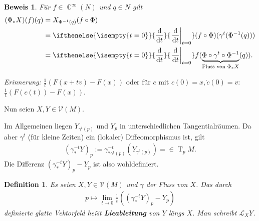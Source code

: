 \documentclass[paper=A4, twoside, chapterprefix=true, bibliography=totoc, headsepline]{scrbook}
\DeclareMathOperator{\C}{\mathbb{C}}
\DeclareMathOperator{\T}{T}         %
\newcommand{\dop}{\mathrm{d}}
\newcommand{\difffrac}[3][]{\ifthenelse{\isempty{#1}}{\frac{\dop #2}{\dop #3}}{\left. \frac{\dop #2}{\dop #3} \right|_{#1}}}
\theoremstyle{plain}
\newtheorem{Dfn}{Definition}[chapter]
\newtheorem{Bem}[Dfn]{Bemerkung}
\theoremstyle{nonumberplain}
\newtheorem{bew}{Beweis}
\theoremstyle{empty}
\theoremstyle{break}
\newcommand{\CmIndex}[2][]{\ifthenelse{\isempty{#1}}{\index{#2}}{\index{#1}}#2}
\newcommand{\CmMark}[2][]{\textbf{\CmIndex[#1]{#2}}}
\begin{document}
\begin{bew}
F\"ur $f \in \C^{\infty}(N)$ und $q \in N$ gilt
\begin{align*}
	(\Phi_{\ast}X)(f)(q) & = X_{\Phi^{-1}(q)}(f \circ \Phi)\\
	& = \difffrac[t=0]{}{t} (f \circ \Phi)(\gamma^t(\Phi^{-1}(q)))\\
	& = \difffrac[t=0]{}{t}f(\underbrace{\Phi \circ \gamma^t \circ \Phi^{-1}}_{\text{Fluss von }\Phi_{*}X}(q)).
\end{align*}
\end{bew}

\emph{Erinnerung:} $\frac{1}t(F(x+tv)-F(x))$ oder f\"ur $c$ mit $c(0) = x, \dot c(0) = v$: $\frac{1}t(F(c(t))-F(x))$.

Nun seien $X,Y \in \mathcal V(M)$.
\begin{center}\end{center}

Im Allgemeinen liegen $Y_{\gamma^t(p)}$ und $Y_p$ in unterschiedlichen Tangentialr\"aumen.
Da aber $\gamma^t$ (f\"ur kleine Zeiten) ein (lokaler) Diffeomorphismus ist, gilt
\begin{align*}
  (\gamma_{*}^{-t}Y)_p := \gamma_{*\gamma^t(p)}^{-t}(Y_{\gamma^t(p)}) = \in \T_pM.
\end{align*}
Die Differenz $(\gamma_{*}^{-t}Y)_p - Y_p$ ist also wohldefiniert. 

\begin{Dfn}
  Es seien $X,Y \in \mathcal V(M)$ und $\gamma$ der Fluss von $X$.
Das durch 
\begin{align*}
  p \mapsto \lim_{t\to 0}\frac{1}t\left(\left(\gamma_{*}^{-t}Y\right)_p-Y_p\right)
\end{align*}
definierte glatte Vektorfeld hei\"st \CmMark{Lieableitung} von $Y$ l\"angs $X$. Man schreibt $\mathcal L_XY$.
\end{Dfn}
\end{document}
